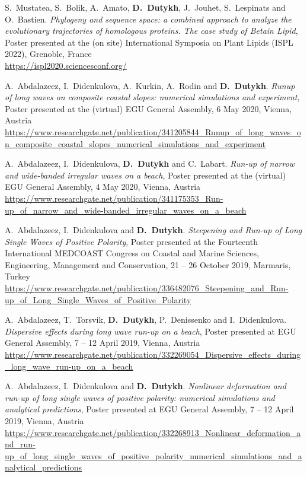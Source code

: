 \documentclass[final, a4paper, oneside, 12pt]{article}
\numberwithin{equation}{section}
\begin{document}
\begin{etaremune}

  \item S.~Mustatea, S.~Bolik, A.~Amato, \textbf{D.~Dutykh}, J.~Jouhet, S.~Lespinats and O.~Bastien. \textit{Phylogeny and sequence space: a combined approach to analyze the evolutionary trajectories of homologous proteins. The case study of Betain Lipid}, Poster presented at the (on site) International Symposia on Plant Lipids (ISPL 2022), Grenoble, France \\
  \url{https://ispl2020.sciencesconf.org/}

  \item A.~Abdalazeez, I.~Didenkulova, A.~Kurkin, A.~Rodin and \textbf{D.~Dutykh}. \textit{Runup of long waves on composite coastal slopes: numerical simulations and experiment}, Poster presented at the (virtual) EGU General Assembly, 6 May 2020, Vienna, Austria \\
  \url{https://www.researchgate.net/publication/341205844_Runup_of_long_waves_on_composite_coastal_slopes_numerical_simulations_and_experiment}

  \item A.~Abdalazeez, I.~Didenkulova, \textbf{D.~Dutykh} and C.~Labart. \textit{Run-up of narrow and wide-banded irregular waves on a beach}, Poster presented at the (virtual) EGU General Assembly, 4 May 2020, Vienna, Austria \\
  \url{https://www.researchgate.net/publication/341175353_Run-up_of_narrow_and_wide-banded_irregular_waves_on_a_beach}

  \item A.~Abdalazeez, I.~Didenkulova and \textbf{D.~Dutykh}. \textit{Steepening and Run-up of Long Single Waves of Positive Polarity}, Poster presented at the Fourteenth International MEDCOAST Congress on Coastal and Marine Sciences, Engineering, Management and Conservation, 21 -- 26 October 2019, Marmaris, Turkey \\
  \url{https://www.researchgate.net/publication/336482076_Steepening_and_Run-up_of_Long_Single_Waves_of_Positive_Polarity}

  \item A.~Abdalazeez, T.~Torsvik, \textbf{D.~Dutykh}, P.~Denissenko and I.~Didenkulova. \textit{Dispersive effects during long wave run-up on a beach}, Poster presented at EGU General Assembly, 7 -- 12 April 2019, Vienna, Austria \\
  \url{https://www.researchgate.net/publication/332269054_Dispersive_effects_during_long_wave_run-up_on_a_beach}
  
  \item A.~Abdalazeez, I.~Didenkulova and \textbf{D.~Dutykh}. \textit{Nonlinear deformation and run-up of long single waves of positive polarity: numerical simulations and analytical predictions}, Poster presented at EGU General Assembly, 7 -- 12 April 2019, Vienna, Austria \\
  \url{https://www.researchgate.net/publication/332268913_Nonlinear_deformation_and_run-up_of_long_single_waves_of_positive_polarity_numerical_simulations_and_analytical_predictions}

\end{etaremune}
\end{document}
